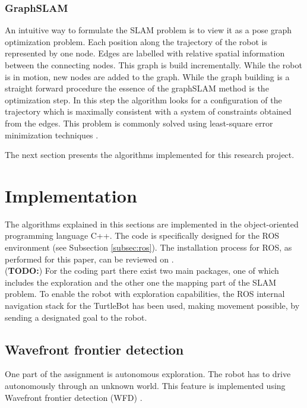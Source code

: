 \documentclass{ba-kecs}
\begin{document}
\subsubsection{GraphSLAM}
An intuitive way to formulate the SLAM problem is to view it as a pose graph optimization problem. Each position along the trajectory of the robot is represented by one node. Edges are labelled with relative spatial information between the connecting nodes. This graph is build incrementally. While the robot is in motion, new nodes are added to the graph. While the graph building is a straight forward procedure the essence of the graphSLAM method is the optimization step. In this step the algorithm looks for a configuration of the trajectory which is maximally consistent with a system of constraints obtained from the edges. This problem is commonly solved using least-square error minimization techniques \citep{Grisetti}.

The next section presents the algorithms implemented for this research project.

\section{Implementation}
\label{sec:impl}

The algorithms explained in this sections are implemented in the object-oriented programming language C++. The code is specifically designed for the ROS environment (see Subsection \ref{subsec:ros}). The installation process for ROS, as performed for this paper, can be reviewed on \cite{swarmlab}.\\
(\textbf{TODO:})
For the coding part there exist two main packages, one of which includes the exploration and the other one the mapping part of the SLAM problem. To enable the robot with exploration capabilities, the ROS internal navigation stack for the TurtleBot has been used, making movement possible, by sending a designated goal to the robot.

\subsection{Wavefront frontier detection}

One part of the assignment is autonomous exploration. The robot has to drive autonomously through an unknown world. This feature is implemented using Wavefront frontier detection (WFD) \citep{Keidar}.
\end{document}
